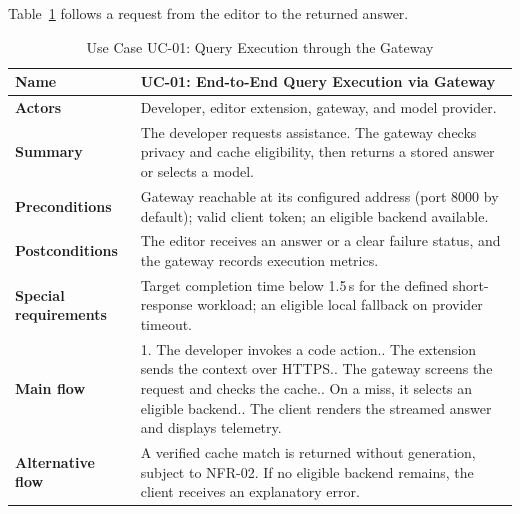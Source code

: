 Table~\ref{tab:uc01} follows a request from the editor to the returned answer.
\begin{table}[H]
\centering\small
\caption{Use Case UC-01: Query Execution through the Gateway}
\label{tab:uc01}
\renewcommand{\arraystretch}{1.08}
\begin{tabularx}{\textwidth}{|p{3.1cm}|X|}
\hline
\textbf{Name} & UC-01: End-to-End Query Execution via Gateway \\ \hline
\textbf{Actors} & Developer, editor extension, gateway, and model provider. \\ \hline
\textbf{Summary} & The developer requests assistance. The gateway checks privacy and cache eligibility, then returns a stored answer or selects a model. \\ \hline
\textbf{Preconditions} & Gateway reachable at its configured address (port 8000 by default); valid client token; an eligible backend available. \\ \hline
\textbf{Postconditions} & The editor receives an answer or a clear failure status, and the gateway records execution metrics. \\ \hline
\textbf{Special requirements} & Target completion time below 1.5\,s for the defined short-response workload; an eligible local fallback on provider timeout. \\ \hline
\textbf{Main flow} & 1. The developer invokes a code action.\newline 2. The extension sends the context over HTTPS.\newline 3. The gateway screens the request and checks the cache.\newline 4. On a miss, it selects an eligible backend.\newline 5. The client renders the streamed answer and displays telemetry. \\ \hline
\textbf{Alternative flow} & A verified cache match is returned without generation, subject to NFR-02. If no eligible backend remains, the client receives an explanatory error. \\ \hline
\end{tabularx}
\end{table}

